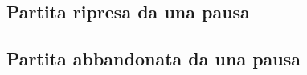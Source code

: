         \subsection{Partita ripresa da una pausa}
            \begin{figure}[h!]
            \end{figure}
            
        \newpage
        \subsection{Partita abbandonata da una pausa}
            \begin{figure}[h!]
            \end{figure}
    